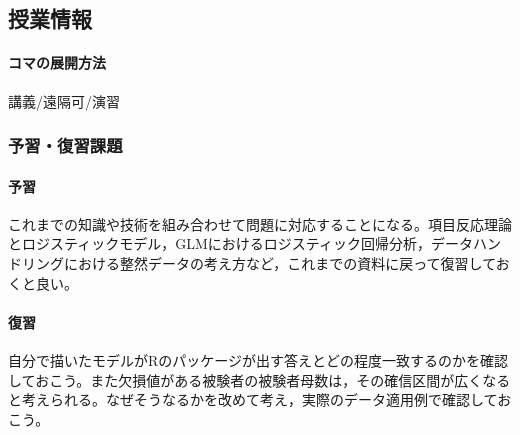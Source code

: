 \subsection{授業情報}
\paragraph{コマの展開方法}
講義/遠隔可/演習
\subsubsection{予習・復習課題}
\paragraph{予習} これまでの知識や技術を組み合わせて問題に対応することになる。項目反応理論とロジスティックモデル，GLMにおけるロジスティック回帰分析，データハンドリングにおける整然データの考え方など，これまでの資料に戻って復習しておくと良い。
\paragraph{復習} 自分で描いたモデルがRのパッケージが出す答えとどの程度一致するのかを確認しておこう。また欠損値がある被験者の被験者母数は，その確信区間が広くなると考えられる。なぜそうなるかを改めて考え，実際のデータ適用例で確認しておこう。
